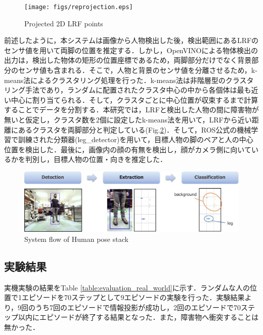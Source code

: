 \documentclass[12pt]{sonota/aislab}
\begin{document}
\begin{figure}[t]
\begin{center}
\texttt{[image: figs/reprojection.eps]}
\caption{Projected 2D LRF points}
\label{reprojection}
\end{center}
\end{figure}

前述したように，本システムは画像から人物検出した後，検出範囲にあるLRFのセンサ値を用いて両脚の位置を推定する．しかし，OpenVINOによる物体検出の出力は，検出した物体の矩形の位置座標であるため，両脚部分だけでなく背景部分のセンサ値も含まれる．そこで，人物と背景のセンサ値を分離させるため，k-means法によるクラスタリング処理を行った．k-means法は非階層型のクラスタリング手法であり，ランダムに配置されたクラスタ中心の中から各個体は最も近い中心に割り当てられる．そして，クラスタごとに中心位置が収束するまで計算することでデータを分割する．本研究では，LRFと検出した人物の間に障害物が無いと仮定し，クラスタ数を2個に設定したk-means法を用いて，LRFから近い距離にあるクラスタを両脚部分と判定している(Fig.\ref{human_lidar_flow})．そして，ROS公式の機械学習で訓練された分類器(leg\_detector)を用いて，目標人物の脚のペアと人の中心位置を検出した．最後に，画像内の顔の有無を検出し，顔がカメラ側に向いているかを判別し，目標人物の位置・向きを推定した．

\begin{figure}[t]
\begin{center}
\includegraphics[clip, width=13cm]{figs/human_lidar_flow.eps}
\caption{System flow of Human pose stack}
\label{human_lidar_flow}
\end{center}
\end{figure}

\subsection{実験結果}
実機実験の結果をTable \ref{table:evaluation_real_world}に示す．ランダムな人の位置で1エピソードを70ステップとして9エピソードの実験を行った．実験結果より，9回のうち7回のエピソードで情報投影が成功し，2回のエピソードで70ステップ以内にエピソードが終了する結果となった．また，障害物へ衝突することは無かった．
\end{document}
